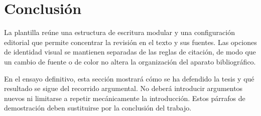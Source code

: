 \section*{Conclusión}
La plantilla reúne una estructura de escritura modular y una configuración editorial que permite concentrar la revisión en el texto y sus fuentes.
Las opciones de identidad visual se mantienen separadas de las reglas de citación, de modo que un cambio de fuente o de color no altera la organización del aparato bibliográfico.

En el ensayo definitivo, esta sección mostrará cómo se ha defendido la tesis y qué resultado se sigue del recorrido argumental.
No deberá introducir argumentos nuevos ni limitarse a repetir mecánicamente la introducción.
Estos párrafos de demostración deben sustituirse por la conclusión del trabajo.
